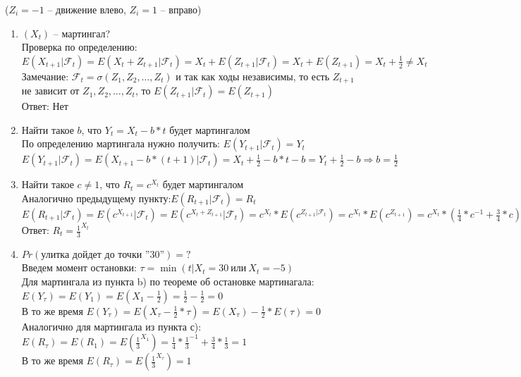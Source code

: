 \documentclass[a4paper]{article}
\begin{document}
(${Z}_i=-1$ -- движение влево, ${Z}_i=1$ -- вправо)
\begin{enumerate}[label={\alph*)}]
\item $({X}_t)$ -- мартингал?\\
Проверка по определению: $E({X}_{t+1}|\mathcal{F}_t)=E({X}_t+{Z}_{t+1}|\mathcal{F}_t)={X}_t+E({Z}_{t+1}|\mathcal{F}_t)={X}_t+E({Z}_{t+1})={X}_t+\frac{1}{2}\neq{X}_t $
\\ Замечание: $\mathcal{F}_t= \sigma({Z}_1,{Z}_2,\dots,{Z}_t)$ и так как ходы независимы, то есть ${Z}_{t+1}$ не зависит от ${Z}_1,{Z}_2,\dots,{Z}_t$, то $E({Z}_{t+1}|\mathcal{F}_t)=E({Z}_{t+1})$
\\ Ответ: Нет
\item Найти такое $b$, что ${Y}_t={X}_t-b*t$ будет мартингалом \\
По определению мартингала нужно получить: $E({Y}_{t+1}|\mathcal{F}_t)={Y}_t$
\\ $E({Y}_{t+1}|\mathcal{F}_t)=E({X}_{t+1}-b*(t+1)|\mathcal{F}_t)={X}_t+\frac{1}{2}-b*t-b={Y}_t+\frac{1}{2}-b \Rightarrow b=\frac{1}{2}$
\item  Найти такое $c\neq{1}$, что ${R}_t=c^{{X}_t}$ будет мартингалом
\\ Аналогично предыдущему пункту:$E({R}_{t+1}|\mathcal{F}_t)={R}_t$
\\ $E({R}_{t+1}|\mathcal{F}_t)=E(c^{{X}_{t+1}}|\mathcal{F}_t)=E(c^{{X}_t+{Z}_{t+1}}|\mathcal{F}_t)=c^{{X}_t}*E(c^{{Z}_{t+1}|\mathcal{F}_t})=c^{{X}_t}*E(c^{{Z}_{t+1}})=c^{{X}_t}*(\frac{1}{4}*c^{-1}+\frac{3}{4}*c)={R}_t=c^{{X}_t} \Rightarrow \frac{1}{4}*c^{-1}+\frac{3}{4}*c=1 \Rightarrow  3*c^2-4*c+1=0 \Rightarrow {c}_1=1,{c}_2=\frac{1}{3}$
\\ Ответ: ${R}_t={\frac{1}{3}}^{{X}_t}$
\item $Pr(\text{улитка дойдет до точки ''30''})=?$
\\ Введем момент остановки: $\tau=\min(t|{X}_t=30 \ \text{или} \ {X}_t=-5)$
\\ Для мартингала из пункта b) по теореме об остановке мартинагала: $E({Y}_{\tau})=E({Y}_{1})=E({X}_{1}-\frac{1}{2})=\frac{1}{2}-\frac{1}{2}=0$
\\В то же время $E({Y}_{\tau})=E({X}_{\tau}-\frac{1}{2}*\tau)=E({X}_{\tau})-\frac{1}{2}*E(\tau)=0$
\\Аналогично для мартингала из пункта с): $E({R}_{\tau})=E({R}_{1})=E({\frac{1}{3}}^{{X}_{1}})=\frac{1}{4}*{\frac{1}{3}}^{-1}+\frac{3}{4}*\frac{1}{3}=1$
\\В то же время $E({R}_{\tau})=E({\frac{1}{3}}^{{X}_{\tau}})=1$

\end{enumerate}
\end{document}
